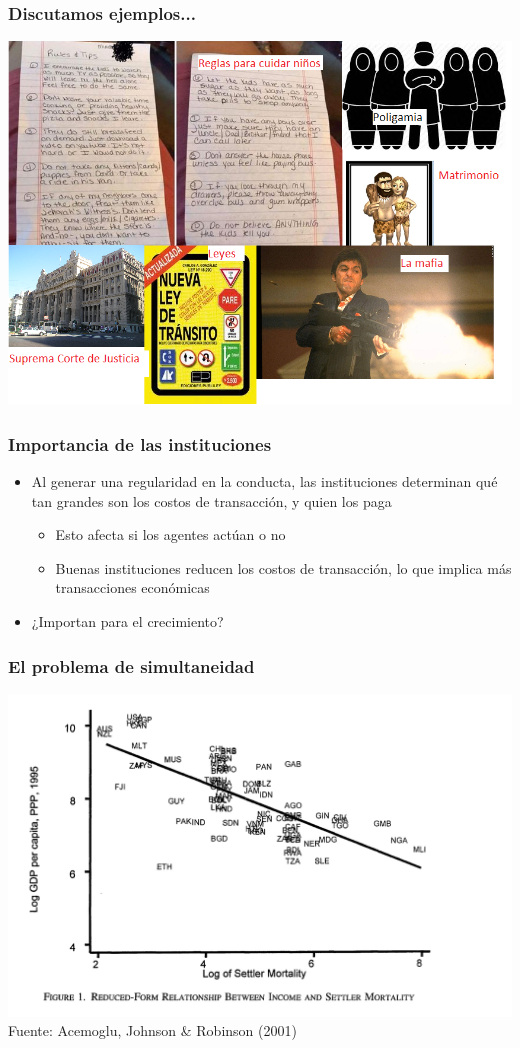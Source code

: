 \documentclass{beamer}
\begin{document}
\begin{frame}
\frametitle{ Discutamos ejemplos...}
\centering
\includegraphics[scale=0.45]{Figures/Tema_04.1_examples.png}
\end{frame}

\begin{frame}
\frametitle{Importancia de las instituciones}
\begin{itemize}
    \item Al generar una regularidad en la conducta, las instituciones determinan qué tan grandes son los costos de transacción, y quien los paga
    \begin{itemize}
        \item Esto afecta si los agentes actúan o no
        \item Buenas instituciones reducen los costos de transacción, lo que implica más transacciones económicas
    \end{itemize}
    \item ¿Importan para el crecimiento?
\end{itemize}
\end{frame}

\begin{frame}
\frametitle{El problema de simultaneidad}
\centering
\includegraphics[scale=0.35]{Figures/Tema_04.1_examples2.png}
\small Fuente: Acemoglu, Johnson & Robinson (2001)
\end{frame}
\end{document}
